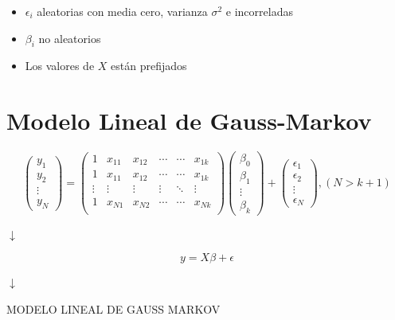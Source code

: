 \documentclass[10pt,a4paper]{book}
\begin{document}
\begin{itemize}
\item $\epsilon_i$ aleatorias con media cero, varianza $\sigma^2$ e incorreladas
\item $\beta_i$ no aleatorios
\item Los valores de $X$ están prefijados
\end{itemize}

	\section{Modelo Lineal de Gauss-Markov}
$$ \left( \begin{array}{c}
y_1\\
y_2\\
\vdots\\
y_N \end{array} \right) = 
\left( \begin{array}{cccccc}
1 & x_{11} & x_{12} & \cdots & \cdots & x_{1k} \\
1 & x_{11} & x_{12} & \cdots & \cdots & x_{1k} \\
\vdots & \vdots & \vdots & \vdots & \ddots & \vdots \\
1 & x_{N1} & x_{N2} & \cdots & \cdots & x_{Nk} \\
\end{array} \right) 
\left( \begin{array}{c}
\beta_0\\
\beta_1\\
\vdots\\
\beta_k \end{array} \right) + 
\left( \begin{array}{c}
\epsilon_1\\
\epsilon_2\\
\vdots\\
\epsilon_N \end{array} \right),(N > k + 1)$$
\begin{center}
$ \downarrow $
\end{center}
$$y = X\beta + \epsilon$$
\begin{center}
$ \downarrow $
\end{center}
\begin{center}
MODELO LINEAL DE GAUSS MARKOV
\end{center}
\end{document}
